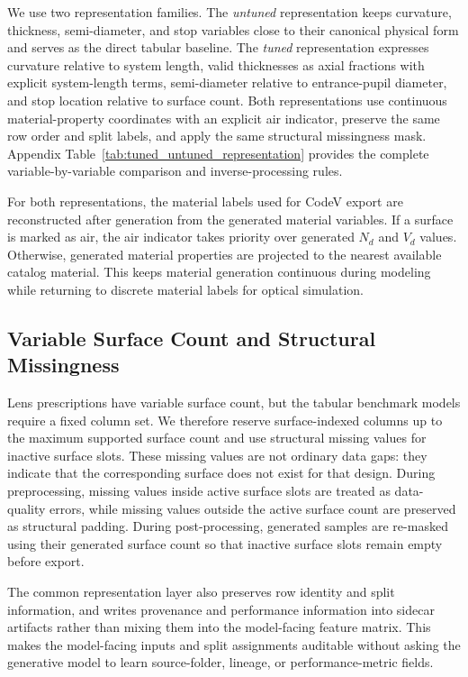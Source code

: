 We use two representation families. The \emph{untuned} representation keeps curvature, thickness, semi-diameter, and stop variables close to their canonical physical form and serves as the direct tabular baseline. The \emph{tuned} representation expresses curvature relative to system length, valid thicknesses as axial fractions with explicit system-length terms, semi-diameter relative to entrance-pupil diameter, and stop location relative to surface count. Both representations use continuous material-property coordinates with an explicit air indicator, preserve the same row order and split labels, and apply the same structural missingness mask. Appendix Table~\ref{tab:tuned_untuned_representation} provides the complete variable-by-variable comparison and inverse-processing rules.

For both representations, the material labels used for CodeV export are reconstructed after generation from the generated material variables. If a surface is marked as air, the air indicator takes priority over generated $N_d$ and $V_d$ values. Otherwise, generated material properties are projected to the nearest available catalog material. This keeps material generation continuous during modeling while returning to discrete material labels for optical simulation.

\subsection{Variable Surface Count and Structural Missingness}

Lens prescriptions have variable surface count, but the tabular benchmark models require a fixed column set. We therefore reserve surface-indexed columns up to the maximum supported surface count and use structural missing values for inactive surface slots. These missing values are not ordinary data gaps: they indicate that the corresponding surface does not exist for that design. During preprocessing, missing values inside active surface slots are treated as data-quality errors, while missing values outside the active surface count are preserved as structural padding. During post-processing, generated samples are re-masked using their generated surface count so that inactive surface slots remain empty before export.

The common representation layer also preserves row identity and split information, and writes provenance and performance information into sidecar artifacts rather than mixing them into the model-facing feature matrix. This makes the model-facing inputs and split assignments auditable without asking the generative model to learn source-folder, lineage, or performance-metric fields.

